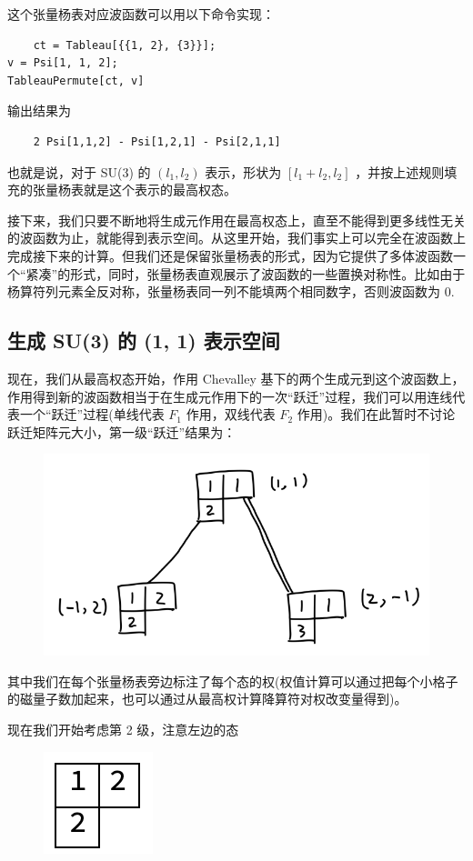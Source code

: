 \documentclass[UTF8]{ctexart}
\begin{document}
\noindent 这个张量杨表对应波函数可以用以下命令实现：
\begin{verbatim}
	ct = Tableau[{{1, 2}, {3}}];
v = Psi[1, 1, 2];
TableauPermute[ct, v]
\end{verbatim}
输出结果为
\begin{verbatim}
	2 Psi[1,1,2] - Psi[1,2,1] - Psi[2,1,1]
\end{verbatim}
也就是说，对于 SU(3) 的 $(l_1,l_2)$ 表示，形状为 $[l_1+l_2,l_2]$ ，并按上述规则填充的张量杨表就是这个表示的最高权态。

接下来，我们只要不断地将生成元作用在最高权态上，直至不能得到更多线性无关的波函数为止，就能得到表示空间。从这里开始，我们事实上可以完全在波函数上完成接下来的计算。但我们还是保留张量杨表的形式，因为它提供了多体波函数一个“紧凑”的形式，同时，张量杨表直观展示了波函数的一些置换对称性。比如由于杨算符列元素全反对称，张量杨表同一列不能填两个相同数字，否则波函数为 0.

\subsection*{生成 SU(3) 的 (1, 1) 表示空间}
\noindent 现在，我们从最高权态开始，作用 Chevalley 基下的两个生成元到这个波函数上，作用得到新的波函数相当于在生成元作用下的一次“跃迁”过程，我们可以用连线代表一个“跃迁”过程(单线代表 $F_1$ 作用，双线代表 $F_2$ 作用)。我们在此暂时不讨论跃迁矩阵元大小，第一级“跃迁”结果为：

\begin{figure}[H]
\begin{centering}
\includegraphics[width=0.5\linewidth]{include/T1}
\par\end{centering}
\end{figure}

\noindent 其中我们在每个张量杨表旁边标注了每个态的权(权值计算可以通过把每个小格子的磁量子数加起来，也可以通过从最高权计算降算符对权改变量得到)。

现在我们开始考虑第 2 级，注意左边的态

\begin{figure}[H]
\begin{centering}
\includegraphics[width=0.1\linewidth]{include/Y4}
\par\end{centering}
\end{figure}
\end{document}
